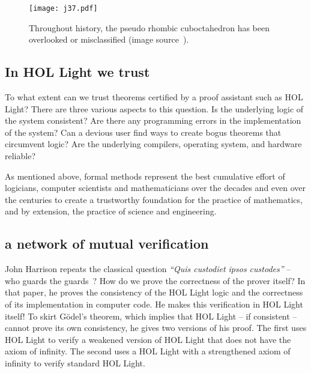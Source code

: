 \documentclass{llncs}
\begin{document}
\begin{figure}[h!]
  \centering
\texttt{[image: j37.pdf]}
\caption{Throughout history, the pseudo rhombic cuboctahedron has been
  overlooked or misclassified (image source~\cite{pseudo}).}
\label{fig:pseudo}
\end{figure}
















\subsection{In HOL Light we trust}

To what extent can we trust theorems certified by a proof assistant
such as HOL Light?  There are three various aspects to this question.
Is the underlying logic of the system consistent?  Are there any
programming errors in the implementation of the system?  Can a devious
user find ways to create bogus theorems that circumvent logic?  Are
the underlying compilers, operating system, and hardware reliable?

As mentioned above, formal methods represent the best cumulative effort of
logicians, computer scientists and mathematicians over the decades and
even over the centuries to create a trustworthy foundation for the
practice of mathematics, and by extension, the practice of science and
engineering.  

\subsection{a network of mutual verification}

John Harrison
repeats the classical question
{\it ``Quis custodiet ipsos custodes''} -- who guards the
guards~\cite{HaSelf}?  How do we prove the correctness of the prover
itself?  In that paper, he proves the consistency of the HOL Light
logic and the correctness of its implementation in computer code.  He
makes this verification in HOL Light itself!  To skirt G\"odel's
theorem, which implies that HOL Light -- if consistent -- cannot prove
its own consistency, he gives two versions of his proof.  The first
uses HOL Light to verify a weakened version of HOL Light that does not
have the axiom of infinity.  The second uses a HOL Light with a
strengthened axiom of infinity to verify standard HOL Light.
\end{document}
